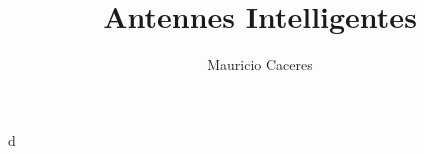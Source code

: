 \documentclass[11pt]{beamer}
\begin{document}
	\author{Mauricio Caceres}
	\title{Antennes Intelligentes}
	\subtitle{}
	\logo{}
	\institute{}
	\date{}
	\subject{}
	\frame[plain]{\maketitle}d
	
	\begin{frame}
		\frametitle{}
	\end{frame}
\end{document}
